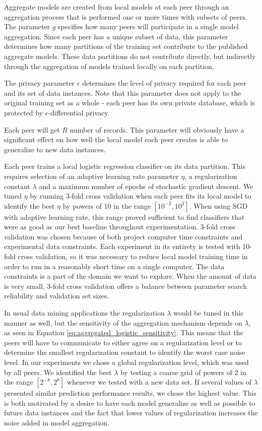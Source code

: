 Aggregate models are created from local models at each peer through an aggregation process that is performed one or more times with subsets of peers. The parameter $g$ specifies how many peers will participate in a single model aggregation. Since each peer has a unique subset of data, this parameter determines how many partitions of the training set contribute to the published aggregate models. These data partitions do not contribute directly, but indirectly through the aggregation of models trained locally on each partition.

The privacy parameter $\epsilon$ determines the level of privacy required for each peer and its set of data instances. Note that this parameter does not apply to the original training set as a whole - each peer has its own private database, which is protected by $\epsilon$-differential privacy. 

Each peer will get $R$ number of records. This parameter will obviously have a significant effect on how well the local model each peer creates is able to generalize to new data instances. 

Each peer trains a local logistic regression classifier on its data partition. This requires selection of an adaptive learning rate parameter $\eta$, a regularization constant $\lambda$ and a maximum number of epochs of stochastic gradient descent. We tuned $\eta$ by running 3-fold cross validation when each peer fits its local model to identify the best $\eta$ by powers of 10 in the range $[10^{-2}, 10^{2}]$. When using SGD with adaptive learning rate, this range proved sufficient to find classifiers that were as good as our best baseline throughout experimentation. 3-fold cross validation was chosen because of both project computer time constraints and experimental data constraints. Each experiment in its entirety is tested with 10-fold cross validation, so it was necessary to reduce local model training time in order to run in a reasonably short time on a single computer. The data constraints is a part of the domain we want to explore. When the amount of data is very small, 3-fold cross validation offers a balance between parameter search reliability and validation set sizes.

In usual data mining applications the regularization $\lambda$ would be tuned in this manner as well, but the sensitivity of the aggregation mechanism depends on $\lambda$, as seen in Equation \ref{eq:aggregated_logistic_sensitivity}. This means that the peers will have to communicate to either agree on a regularization level or to determine the smallest regularization constant to identify the worst case noise level. In our experiments we chose a global regularization level, which was used by all peers. We identified the best $\lambda$ by testing a coarse grid of powers of 2 in the range $[2^{-8}, 2^{8}]$ whenever we tested with a new data set. If several values of $\lambda$ presented similar prediction performance results, we chose the highest value. This is both motivated by a desire to have each model generalize as well as possible to future data instances and the fact that lower values of regularization increases the noise added in model aggregation.

